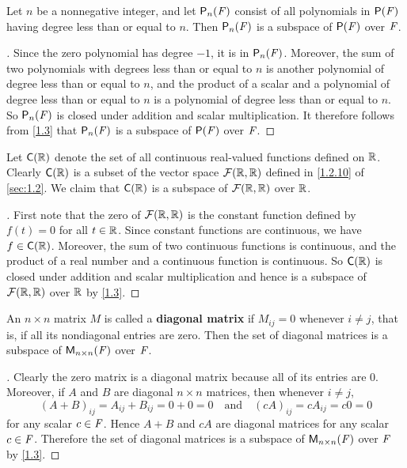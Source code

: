 \begin{eg}\label{1.3.6}
  Let \(n\) be a nonnegative integer, and let \(\ps[n]{\F}\) consist of all polynomials in \(\ps{\F}\) having degree less than or equal to \(n\).
  Then \(\ps[n]{\F}\) is a subspace of \(\ps{\F}\) over \(\mathit{F}\).
\end{eg}

\begin{proof}[]
  Since the zero polynomial has degree \(-1\), it is in \(\ps[n]{\F}\).
  Moreover, the sum of two polynomials with degrees less than or equal to \(n\) is another polynomial of degree less than or equal to \(n\), and the product of a scalar and a polynomial of degree less than or equal to \(n\) is a polynomial of degree less than or equal to \(n\).
  So \(\ps[n]{\F}\) is closed under addition and scalar multiplication.
  It therefore follows from \cref{1.3} that \(\ps[n]{\F}\) is a subspace of \(\ps{\F}\) over \(\mathit{F}\).
\end{proof}

\begin{eg}\label{1.3.7}
  Let \(\cfs{\R}\) denote the set of all continuous real-valued functions defined on \(\mathbb{R}\).
  Clearly \(\cfs{\R}\) is a subset of the vector space \(\fs{\R}{\R}\) defined in \cref{1.2.10} of \cref{sec:1.2}.
  We claim that \(\cfs{\R}\) is a subspace of \(\fs{\R}{\R}\) over \(\mathbb{R}\).
\end{eg}

\begin{proof}[]
  First note that the zero of \(\fs{\R}{\R}\) is the constant function defined by \(f(t) = 0\) for all \(t \in \mathbb{R}\).
  Since constant functions are continuous, we have \(f \in \cfs{\R}\).
  Moreover, the sum of two continuous functions is continuous, and the product of a real number and a continuous function is continuous.
  So \(\cfs{\R}\) is closed under addition and scalar multiplication and hence is a subspace of \(\fs{\R}{\R}\) over \(\mathbb{R}\) by \cref{1.3}.
\end{proof}

\begin{eg}\label{1.3.8}
  An \(n \times n\) matrix \(M\) is called a \textbf{diagonal matrix} if \(M_{i j} = 0\) whenever \(i \neq j\), that is, if all its nondiagonal entries are zero.
  Then the set of diagonal matrices is a subspace of \(\mathsf{M}_{{n} \times n}({\mathit{F}})\) over \(\mathit{F}\).
\end{eg}

\begin{proof}[]
  Clearly the zero matrix is a diagonal matrix because all of its entries are \(0\).
  Moreover, if \(A\) and \(B\) are diagonal \(n \times n\) matrices, then whenever \(i \neq j\),
  \[
    (A + B)_{i j} = A_{i j} + B_{i j} = 0 + 0 = 0 \quad \text{and} \quad (cA)_{i j} = cA_{i j} = c0 = 0
  \]
  for any scalar \(c \in \mathit{F}\).
  Hence \(A + B\) and \(cA\) are diagonal matrices for any scalar \(c \in \mathit{F}\).
  Therefore the set of diagonal matrices is a subspace of \(\mathsf{M}_{{n} \times n}({\mathit{F}})\) over \(\mathit{F}\) by \cref{1.3}.
\end{proof}

